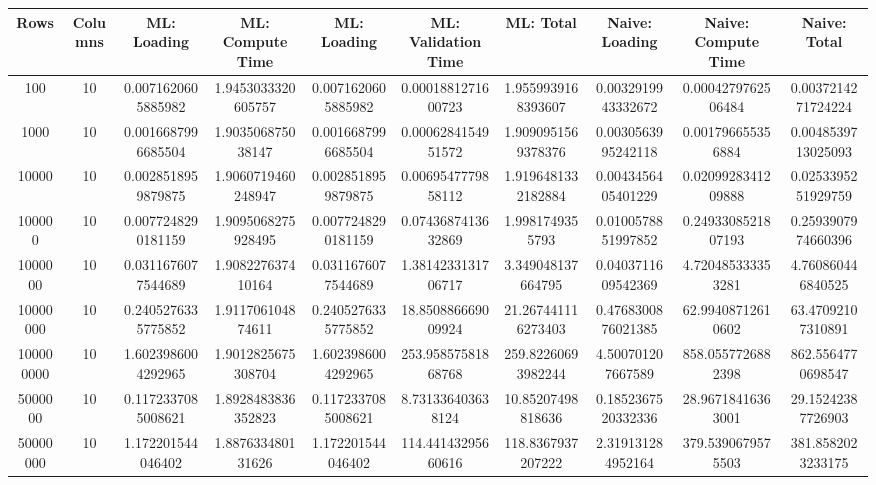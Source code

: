 \begin{table}[htb]
    \centering
    \begin{tabular}{@{}cccccccccc@{}}
        \toprule
        Rows & Columns & ML: Loading & ML: Compute Time & ML: Loading & ML: Validation Time & ML: Total & Naive: Loading & Naive: Compute Time & Naive: Total \\
        \midrule
        100 & 10 & 0.0071620605885982 & 1.9453033320605757 & 0.0071620605885982 & 0.0001881271600723 & 1.9559939168393607 & 0.0032919943332672 & 0.0004279762506484 & 0.0037214271724224 \\
        1000 & 10 & 0.0016687996685504 & 1.903506875038147 & 0.0016687996685504 & 0.0006284154951572 & 1.9090951569378376 & 0.0030563995242118 & 0.001796655356884 & 0.0048539713025093 \\
        10000 & 10 & 0.0028518959879875 & 1.9060719460248947 & 0.0028518959879875 & 0.0069547779858112 & 1.9196481332182884 & 0.0043456405401229 & 0.0209928341209888 & 0.0253395251929759 \\
        100000 & 10 & 0.0077248290181159 & 1.9095068275928495 & 0.0077248290181159 & 0.0743687413632869 & 1.9981749355793 & 0.0100578851997852 & 0.2493308521807193 & 0.2593907974660396 \\
        1000000 & 10 & 0.0311676077544689 & 1.908227637410164 & 0.0311676077544689 & 1.3814233131706717 & 3.349048137664795 & 0.0403711609542369 & 4.720485333353281 & 4.760860446840525 \\
        10000000 & 10 & 0.2405276335775852 & 1.911706104874611 & 0.2405276335775852 & 18.850886669009924 & 21.267441116273403 & 0.4768300876021385 & 62.99408712610602 & 63.47092107310891 \\
        100000000 & 10 & 1.6023986004292965 & 1.9012825675308704 & 1.6023986004292965 & 253.95857581868768 & 259.82260693982244 & 4.500701207667589 & 858.0557726882398 & 862.5564770698547 \\
        5000000 & 10 & 0.1172337085008621 & 1.8928483836352823 & 0.1172337085008621 & 8.731336403638124 & 10.85207498818636 & 0.1852367520332336 & 28.96718416363001 & 29.15242387726903 \\
        50000000 & 10 & 1.172201544046402 & 1.887633480131626 & 1.172201544046402 & 114.44143295660616 & 118.8367937207222 & 2.319131284952164 & 379.5390679575503 & 381.8582023233175 \\
        \bottomrule
    \end{tabular}
\end{table}
